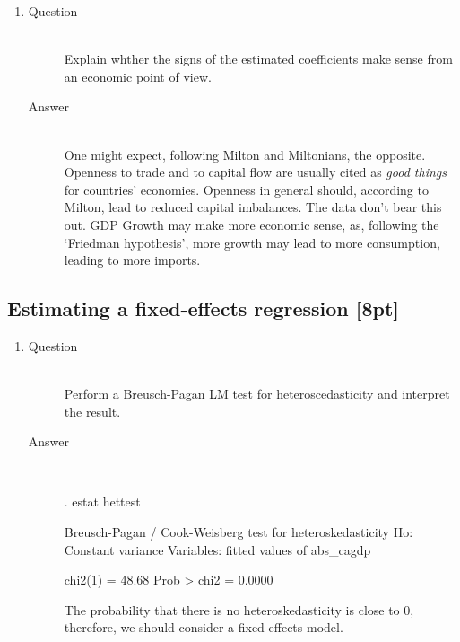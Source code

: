 \documentclass{article}
\begin{document}
  \begin{enumerate}[label=(\alph*)]
    \item 
    \begin{description}
      \item[Question] \hfill \\
      Explain whther the signs of the estimated coefficients make sense from an economic point of view.
      \item[Answer] \hfill \\
      One might expect, following Milton and Miltonians, the opposite. Openness to trade and to capital flow are usually cited as \textit{good things} for countries' economies. Openness in general should, according to Milton, lead to reduced capital imbalances. The data don't bear this out. GDP Growth may make more economic sense, as, following the `Friedman hypothesis', more growth may lead to more consumption, leading to more imports.
    \end{description}
  \end{enumerate}

\subsection{Estimating a fixed-effects regression [8pt]}

  \begin{enumerate}[label=(\alph*)]
    \item 
    \begin{description}
      \item[Question] \hfill \\
      Perform a Breusch-Pagan LM test for heteroscedasticity and interpret the result.
      \item[Answer] \hfill \\
      \begin{CVerbatim}
. estat hettest

Breusch-Pagan / Cook-Weisberg test for heteroskedasticity 
         Ho: Constant variance
         Variables: fitted values of abs_cagdp

         chi2(1)      =    48.68
         Prob > chi2  =   0.0000
      \end{CVerbatim}
      The probability that there is no heteroskedasticity is close to 0, therefore, we should consider a fixed effects model.
    \end{description}
  \end{enumerate}
  
\end{document}

